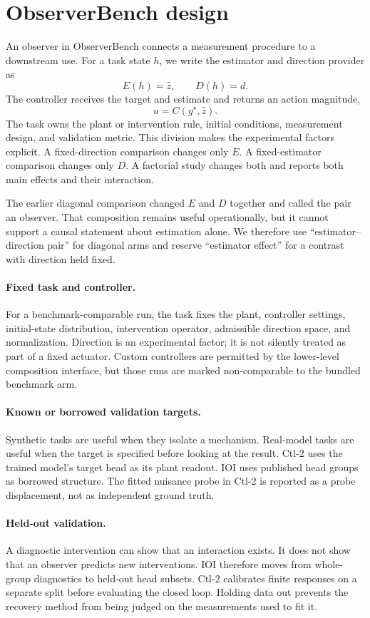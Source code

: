 \section{ObserverBench design}

An observer in ObserverBench connects a measurement procedure to a downstream
use. For a task state $h$, we write the estimator and direction provider as
\[
E(h)=\widehat z,
\qquad
D(h)=d.
\]
The controller receives the target and estimate and returns an action magnitude,
\[
u=C(y^\star,\widehat z).
\]
The task owns the plant or intervention rule, initial conditions, measurement
design, and validation metric. This division makes the experimental factors
explicit. A fixed-direction comparison changes only $E$. A fixed-estimator
comparison changes only $D$. A factorial study changes both and reports both
main effects and their interaction.

The earlier diagonal comparison changed $E$ and $D$ together and called the
pair an observer. That composition remains useful operationally, but it cannot
support a causal statement about estimation alone. We therefore use
``estimator--direction pair'' for diagonal arms and reserve ``estimator effect''
for a contrast with direction held fixed.

\paragraph{Fixed task and controller.}
For a benchmark-comparable run, the task fixes the plant, controller settings,
initial-state distribution, intervention operator, admissible direction space,
and normalization. Direction is an experimental factor; it is not silently
treated as part of a fixed actuator. Custom controllers are permitted by the
lower-level composition interface, but those runs are marked non-comparable to
the bundled benchmark arm.

\paragraph{Known or borrowed validation targets.}
Synthetic tasks are useful when they isolate a mechanism. Real-model tasks are
useful when the target is specified before looking at the result. Ctl-2 uses the
trained model's target head as its plant readout. IOI uses published head groups
as borrowed structure. The fitted nuisance probe in Ctl-2 is reported as a
probe displacement, not as independent ground truth.

\paragraph{Held-out validation.}
A diagnostic intervention can show that an interaction exists. It does not show
that an observer predicts new interventions. IOI therefore moves from
whole-group diagnostics to held-out head subsets. Ctl-2 calibrates finite
responses on a separate split before evaluating the closed loop. Holding data
out prevents the recovery method from being judged on the measurements used to
fit it.

